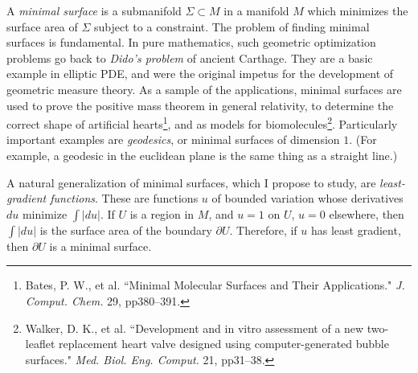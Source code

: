 \documentclass[12pt]{article}
\begin{document}
%
%
%
%
%
%
A \emph{minimal surface} is a submanifold $\Sigma \subset M$ in a manifold $M$ which minimizes the surface area of $\Sigma$ subject to a constraint.
The problem of finding minimal surfaces is fundamental.
In pure mathematics, such geometric optimization problems go back to \emph{Dido's problem} of ancient Carthage.
They are a basic example in elliptic PDE, and were the original impetus for the development of geometric measure theory.
As a sample of the applications, minimal surfaces are used to prove the positive mass theorem in general relativity, to determine the correct shape of artificial hearts\footnote{Bates, P. W., et al. ``Minimal Molecular Surfaces and Their Applications." \emph{J. Comput. Chem.} 29, pp380--391.}, and as models for biomolecules\footnote{Walker, D. K., et al. ``Development and in vitro assessment of a new two-leaflet replacement heart valve designed using computer-generated bubble surfaces." \emph{Med. Biol. Eng. Comput.} 21, pp31--38.}.
Particularly important examples are \emph{geodesics}, or minimal surfaces of dimension $1$.
(For example, a geodesic in the euclidean plane is the same thing as a straight line.)

A natural generalization of minimal surfaces, which I propose to study, are \emph{least-gradient functions}.
These are functions $u$ of bounded variation whose derivatives $du$ minimize $\int |du|$.
If $U$ is a region in $M$, and $u = 1$ on $U$, $u = 0$ elsewhere, then $\int |du|$ is the surface area of the boundary $\partial U$.
Therefore, if $u$ has least gradient, then $\partial U$ is a minimal surface.
\end{document}
